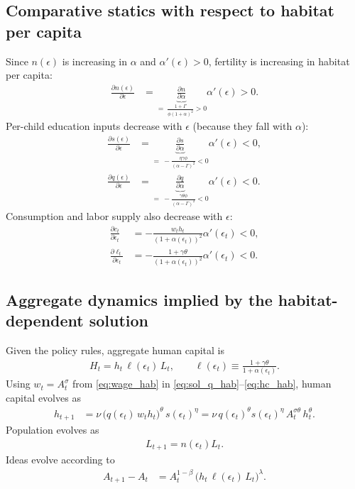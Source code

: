 \documentclass[11pt]{article}
\begin{document}
\subsection{Comparative statics with respect to habitat per capita}
Since $n(\epsilon)$ is increasing in $\alpha$ and $\alpha'(\epsilon)>0$, fertility is increasing in habitat per capita:
\begin{align}
\frac{\partial n(\epsilon)}{\partial \epsilon}
&=
\underbrace{\frac{\partial n}{\partial \alpha}}_{=\ \frac{1+\Gamma}{\phi(1+\alpha)^2}>0}
\alpha'(\epsilon)
>0.
\label{eq:dn_deps_pos_hab}
\end{align}
Per-child education inputs decrease with $\epsilon$ (because they fall with $\alpha$):
\begin{align}
\frac{\partial s(\epsilon)}{\partial \epsilon}
&=
\underbrace{\frac{\partial s}{\partial \alpha}}_{=\ -\frac{\eta\gamma\phi}{(\alpha-\Gamma)^2}<0}
\alpha'(\epsilon)
<0,
\label{eq:ds_deps_neg_hab}
\\
\frac{\partial q(\epsilon)}{\partial \epsilon}
&=
\underbrace{\frac{\partial q}{\partial \alpha}}_{=\ -\frac{\gamma\theta\phi}{(\alpha-\Gamma)^2}<0}
\alpha'(\epsilon)
<0.
\label{eq:dq_deps_neg_hab}
\end{align}
Consumption and labor supply also decrease with $\epsilon$:
\begin{align}
\frac{\partial c_t}{\partial \epsilon_t}
&=
-\frac{w_t h_t}{(1+\alpha(\epsilon_t))^2}\alpha'(\epsilon_t)<0,
\label{eq:dc_deps_neg_hab}\\
\frac{\partial \ell_t}{\partial \epsilon_t}
&=
-\frac{1+\gamma\theta}{(1+\alpha(\epsilon_t))^2}\alpha'(\epsilon_t)<0.
\label{eq:dl_deps_neg_hab}
\end{align}

\subsection{Aggregate dynamics implied by the habitat-dependent solution}
Given the policy rules, aggregate human capital is
\begin{align}
H_t = h_t\,\ell(\epsilon_t)\,L_t,
\qquad
\ell(\epsilon_t)\equiv \frac{1+\gamma\theta}{1+\alpha(\epsilon_t)}.
\label{eq:Hlaw_hab}
\end{align}
Using $w_t=A_t^{\sigma}$ from \eqref{eq:wage_hab} in \eqref{eq:sol_q_hab}--\eqref{eq:hc_hab}, human capital evolves as
\begin{align}
h_{t+1}
&= \nu\,\big(q(\epsilon_t)\, w_t h_t\big)^{\theta}\, s(\epsilon_t)^{\eta}
= \nu\,q(\epsilon_t)^{\theta}s(\epsilon_t)^{\eta}\,A_t^{\sigma\theta}\,h_t^{\theta}.
\label{eq:h_law_hab}
\end{align}
Population evolves as
\begin{align}
L_{t+1}=n(\epsilon_t)L_t.
\label{eq:Llaw_mod_hab}
\end{align}
Ideas evolve according to
\begin{align}
A_{t+1}-A_t
&= A_t^{1-\beta}\,\Big(h_t\,\ell(\epsilon_t)\,L_t\Big)^{\lambda}.
\label{eq:A_law_hab}
\end{align}
\end{document}
